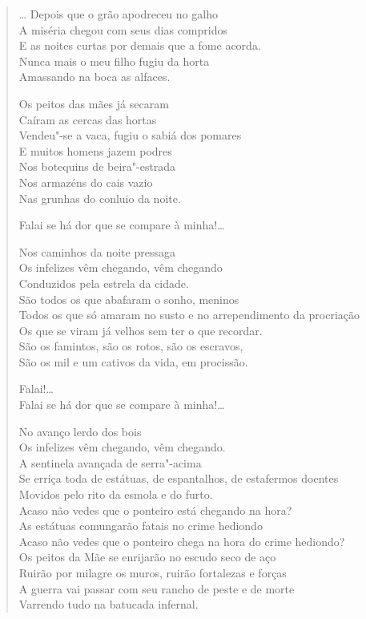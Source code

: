 \begin{verse}
\ldots{} Depois que o grão apodreceu no galho\\
A miséria chegou com seus dias compridos\\
E as noites curtas por demais que a fome acorda.\\
Nunca mais o meu filho fugiu da horta\\
Amassando na boca as alfaces.

Os peitos das mães já secaram\\
Caíram as cercas das hortas\\
Vendeu"-se a vaca, fugiu o sabiá dos pomares\\
E muitos homens jazem podres\\
Nos botequins de beira"-estrada\\
Nos armazéns do cais vazio\\
Nas grunhas do conluio da noite.

Falai se há dor que se compare à minha!\ldots{}

Nos caminhos da noite pressaga\\
Os infelizes vêm chegando, vêm chegando\\
Conduzidos pela estrela da cidade.\\
São todos os que abafaram o sonho, meninos\\
Todos os que só amaram no susto e no arrependimento da procriação\\
Os que se viram já velhos sem ter o que recordar.\\
São os famintos, são os rotos, são os escravos,\\
São os mil e um cativos da vida, em procissão.

Falai!\ldots{}\\
Falai se há dor que se compare à minha!\ldots{}

No avanço lerdo dos bois\\
Os infelizes vêm chegando, vêm chegando.\\
A sentinela avançada de serra"-acima\\
Se erriça toda de estátuas, de espantalhos, de estafermos doentes\\
Movidos pelo rito da esmola e do furto.\\
Acaso não vedes que o ponteiro está chegando na hora?\\
As estátuas comungarão fatais no crime hediondo\\
Acaso não vedes que o ponteiro chega na hora do crime hediondo?\\
Os peitos da Mãe se enrijarão no escudo seco de aço\\
Ruirão por milagre os muros, ruirão fortalezas e forças\\
A guerra vai passar com seu rancho de peste e de morte\\
Varrendo tudo na batucada infernal.


\end{verse}
